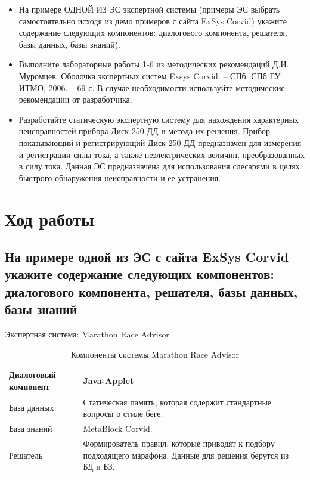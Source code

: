 \documentclass[14pt,a4paper,report]{report}
\begin{document}
\begin{itemize}
	\item На примере ОДНОЙ ИЗ ЭС экспертной системы (примеры ЭС выбрать самостоятельно исходя из демо примеров с сайта ExSys Corvid) укажите содержание следующих компонентов:  диалогового компонента, решателя, базы данных, базы знаний).
	\item Выполните лабораторные работы 1-6 из методических рекомендаций Д.И. Муромцев.
	Оболочка экспертных систем Exsys Corvid. – СПб: СПб ГУ ИТМО, 2006. – 69 с. В случае необходимости используйте методические рекомендации от разработчика.
	\item Разработайте статическую экспертную систему для нахождения характерных неисправностей прибора Диск-250 ДД и метода их решения. Прибор показывающий и регистрирующий Диск-250 ДД предназначен для измерения и регистрации силы тока, а также неэлектрических величин, преобразованных в силу тока. Данная ЭС предназначена для использования слесарями в целях быстрого обнаружения неисправности и ее устранения.
\end{itemize}

\clearpage

\section{Ход работы}

\subsection{На примере одной из ЭС с сайта ExSys Corvid укажите содержание следующих компонентов:  диалогового компонента, решателя, базы данных, базы знаний}

Экспертная система: Marathon Race Advisor

\begin{table}[h!]
	\begin{tabular}{ | P{6cm} | P{10cm} | }
		\hline
		Диалоговый компонент & Java-Applet \\ \hline
		База данных & Статическая память, которая содержит стандартные вопросы о стиле беге. \\ \hline
		База знаний & MetaBlock Corvid. \\ \hline
		Решатель & Формирователь правил, которые приводят к подбору подходящего марафона. Данные для решения берутся из БД и БЗ. \\ \hline
	\end{tabular}
	\caption{Компоненты системы Marathon Race Advisor}
	\label{table:1}
\end{table}
\end{document}
